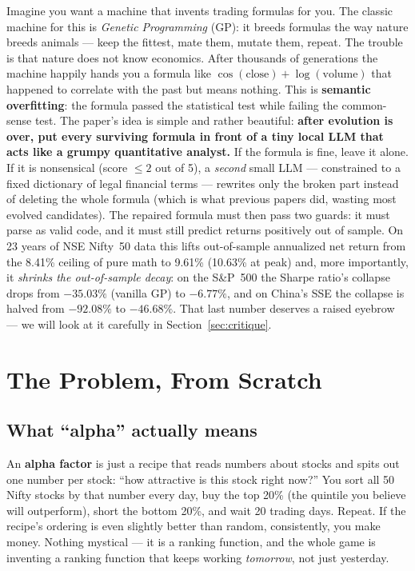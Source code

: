 \documentclass[11pt,a4paper]{article}
\begin{document}
Imagine you want a machine that invents trading formulas for you. The classic
machine for this is \emph{Genetic Programming} (GP): it breeds formulas the way
nature breeds animals --- keep the fittest, mate them, mutate them, repeat. The
trouble is that nature does not know economics. After thousands of generations
the machine happily hands you a formula like
$\cos(\text{close}) + \log(\text{volume})$ that happened to correlate with the
past but means nothing. This is \textbf{semantic overfitting}: the formula
passed the statistical test while failing the common-sense test. The paper's
idea is simple and rather beautiful: \textbf{after evolution is over, put every
surviving formula in front of a tiny local LLM that acts like a grumpy
quantitative analyst.} If the formula is fine, leave it alone. If it is
nonsensical (score $\le 2$ out of 5), a \emph{second} small LLM --- constrained
to a fixed dictionary of legal financial terms --- rewrites only the broken part
instead of deleting the whole formula (which is what previous papers did,
wasting most evolved candidates). The repaired formula must then pass two
guards: it must parse as valid code, and it must still predict returns
positively out of sample. On 23 years of NSE Nifty~50 data this lifts
out-of-sample annualized net return from the 8.41\% ceiling of pure math to
9.61\% (10.63\% at peak) and, more importantly, it \emph{shrinks the
out-of-sample decay}: on the S\&P~500 the Sharpe ratio's collapse drops from
$-35.03\%$ (vanilla GP) to $-6.77\%$, and on China's SSE the collapse is halved
from $-92.08\%$ to $-46.68\%$. That last number deserves a raised eyebrow ---
we will look at it carefully in Section~\ref{sec:critique}.

\section{The Problem, From Scratch}
\label{sec:problem}

\subsection{What ``alpha'' actually means}

\begin{plaineng}
An \textbf{alpha factor} is just a recipe that reads numbers about stocks and
spits out one number per stock: ``how attractive is this stock right now?'' You
sort all 50 Nifty stocks by that number every day, buy the top 20\% (the
quintile you believe will outperform), short the bottom 20\%, and wait 20
trading days. Repeat. If the recipe's ordering is even slightly better than
random, consistently, you make money. Nothing mystical --- it is a ranking
function, and the whole game is inventing a ranking function that keeps working
\emph{tomorrow}, not just yesterday.
\end{plaineng}
\end{document}
